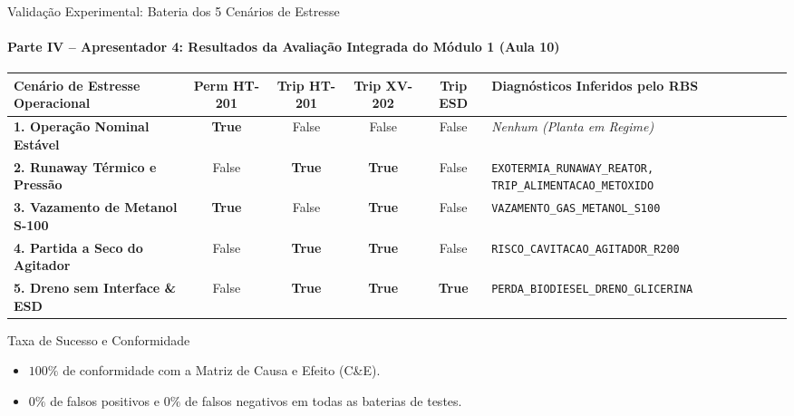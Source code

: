 \documentclass[aspectratio=169, 10pt]{beamer}
\begin{document}
\begin{frame}{Validação Experimental: Bateria dos 5 Cenários de Estresse}
  \framesubtitle{Parte IV -- Apresentador 4: Resultados da Avaliação Integrada do Módulo 1 (Aula 10)}
  \begin{table}[h]
    \centering
    \tiny
    \begin{tabular}{lccccp{4.5cm}}
      \toprule
      \textbf{Cenário de Estresse Operacional} & \textbf{Perm HT-201} & \textbf{Trip HT-201} & \textbf{Trip XV-202} & \textbf{Trip ESD} & \textbf{Diagnósticos Inferidos pelo RBS} \\
      \midrule
      \textbf{1. Operação Nominal Estável} & \textbf{True} & False & False & False & \textit{Nenhum (Planta em Regime)} \\
      \textbf{2. Runaway Térmico e Pressão} & False & \cellcolor{alertred!25}\textbf{True} & \cellcolor{alertred!25}\textbf{True} & False & \texttt{EXOTERMIA\_RUNAWAY\_REATOR, TRIP\_ALIMENTACAO\_METOXIDO} \\
      \textbf{3. Vazamento de Metanol S-100} & \textbf{True} & False & \cellcolor{alertred!25}\textbf{True} & False & \texttt{VAZAMENTO\_GAS\_METANOL\_S100} \\
      \textbf{4. Partida a Seco do Agitador} & False & \cellcolor{alertred!25}\textbf{True} & \cellcolor{alertred!25}\textbf{True} & False & \texttt{RISCO\_CAVITACAO\_AGITADOR\_R200} \\
      \textbf{5. Dreno sem Interface \& ESD} & False & \cellcolor{alertred!25}\textbf{True} & \cellcolor{alertred!25}\textbf{True} & \cellcolor{alertred!25}\textbf{True} & \texttt{PERDA\_BIODIESEL\_DRENO\_GLICERINA} \\
      \bottomrule
    \end{tabular}
  \end{table}

  \begin{exampleblock}{Taxa de Sucesso e Conformidade}
    \begin{itemize}
      \item $100\%$ de conformidade com a Matriz de Causa e Efeito (C\&E).
      \item $0\%$ de falsos positivos e $0\%$ de falsos negativos em todas as baterias de testes.
    \end{itemize}
  \end{exampleblock}
\end{frame}
\end{document}
